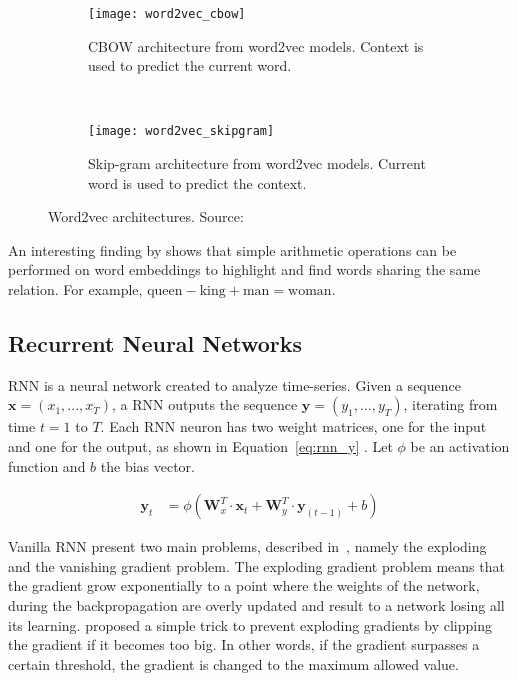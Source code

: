 \begin{figure}
    \centering
    \begin{subfigure}{.45\textwidth}
        \centering
        \texttt{[image: word2vec\_cbow]}
        \caption[Continuous Bag-of-Words architecture]{CBOW architecture from word2vec models. Context is used to predict the current word.}
        \label{fig:cbow}
    \end{subfigure}
    ~
    \begin{subfigure}{.45\textwidth}
        \centering
        \texttt{[image: word2vec\_skipgram]}
        \caption[Skip-gram architecture]{Skip-gram architecture from word2vec models. Current word is used to predict the context.}
        \label{fig:skipgram}
    \end{subfigure}
    \decoRule
    \caption{Word2vec architectures. Source:~\citet{1301.3781}}
    \label{fig:word2vec}
\end{figure}

An interesting finding by \citet{1301.3781} shows that simple arithmetic operations can be performed on word embeddings to highlight and find words sharing the same relation. For example, $\mathrm{queen} - \mathrm{king} + \mathrm{man} = \mathrm{woman}$.

\subsection{Recurrent Neural Networks}
RNN is a neural network created to analyze time-series. Given a sequence $\bm{x} = (x_1, ..., x_T)$, a RNN outputs the sequence $\bm{y} = (y_1, ..., y_T)$, iterating from time $t = 1$ to $T$. Each RNN neuron has two weight matrices, one for the input and one for the output, as shown in Equation~\ref{eq:rnn_y} \citep{geron2017hands}. Let $\phi$ be an activation function and $b$ the bias vector.

\begin{align}
    \label{eq:rnn_y}
    \bm{y}_t &= \phi (\mathbf{W}_x^T \cdot \bm{x}_t + \mathbf{W}_y^T \cdot \bm{y}_{(t-1)} + b)
\end{align}

Vanilla RNN present two main problems, described in~\citet{bengio1994learning}, namely the exploding and the vanishing gradient problem. The exploding gradient problem means that the gradient grow exponentially to a point where the weights of the network, during the backpropagation are overly updated and result to a network losing all its learning. \citet{pascanu2013difficulty} proposed a simple trick to prevent exploding gradients by clipping the gradient if it becomes too big. In other words, if the gradient surpasses a certain threshold, the gradient is changed to the maximum allowed value.

